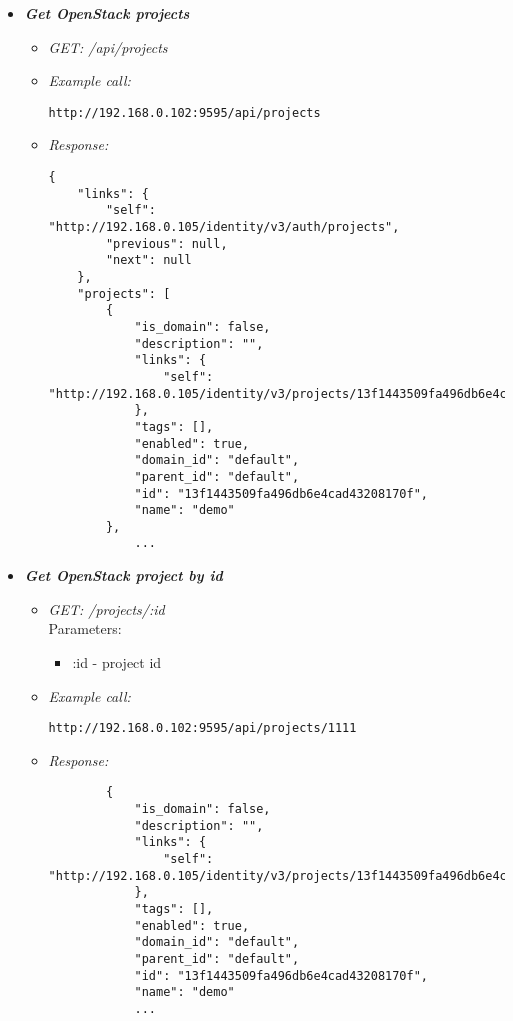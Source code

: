 \begin{itemize}
\item \textbf{\textit{Get OpenStack projects}}
\begin{itemize}
\item \emph{GET: /api/projects}
\item \emph{Example call:}
 \begin{lstlisting}
http://192.168.0.102:9595/api/projects
\end{lstlisting}

\item \emph{Response:}
 \begin{lstlisting}
{
    "links": {
        "self": "http://192.168.0.105/identity/v3/auth/projects",
        "previous": null,
        "next": null
    },
    "projects": [
        {
            "is_domain": false,
            "description": "",
            "links": {
                "self": "http://192.168.0.105/identity/v3/projects/13f1443509fa496db6e4cad43208170f"
            },
            "tags": [],
            "enabled": true,
            "domain_id": "default",
            "parent_id": "default",
            "id": "13f1443509fa496db6e4cad43208170f",
            "name": "demo"
        },
            ...
\end{lstlisting}
\end{itemize}


\item \textbf{\textit{Get OpenStack project by id}}
\begin{itemize}
\item \emph{GET: /projects/:id}
\\Parameters:
\begin{itemize}
\item :id - project id
\end{itemize}

\item \emph{Example call:}
 \begin{lstlisting}
http://192.168.0.102:9595/api/projects/1111
\end{lstlisting}

\item \emph{Response:}
 \begin{lstlisting}
        {
            "is_domain": false,
            "description": "",
            "links": {
                "self": "http://192.168.0.105/identity/v3/projects/13f1443509fa496db6e4cad43208170f"
            },
            "tags": [],
            "enabled": true,
            "domain_id": "default",
            "parent_id": "default",
            "id": "13f1443509fa496db6e4cad43208170f",
            "name": "demo"
            ...
\end{lstlisting}
\end{itemize}


\end{itemize}
